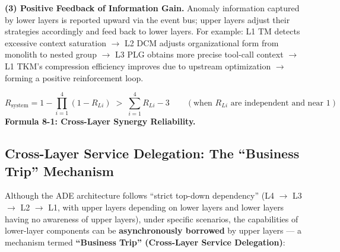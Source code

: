 \documentclass[11pt,a4paper]{article}
\begin{document}
\noindent\textbf{(3) Positive Feedback of Information Gain.} Anomaly information captured by lower layers is reported upward via the event bus; upper layers adjust their strategies accordingly and feed back to lower layers. For example: L1 TM detects excessive context saturation $\rightarrow$ L2 DCM adjusts organizational form from monolith to nested group $\rightarrow$ L3 PLG obtains more precise tool-call context $\rightarrow$ L1 TKM's compression efficiency improves due to upstream optimization $\rightarrow$ forming a positive reinforcement loop.

\begin{equation}\label{eq:cross-layer-synergy}
R_{\text{system}} = 1 - \prod_{i=1}^{4} (1 - R_{Li}) \;>\; \sum_{i=1}^{4} R_{Li} - 3 \qquad (\text{when } R_{Li} \text{ are independent and near } 1)
\end{equation}
\smallskip
\noindent\textbf{Formula 8-1: Cross-Layer Synergy Reliability.}

\subsection{Cross-Layer Service Delegation: The ``Business Trip'' Mechanism}

Although the ADE architecture follows ``strict top-down dependency'' (L4 $\rightarrow$ L3 $\rightarrow$ L2 $\rightarrow$ L1, with upper layers depending on lower layers and lower layers having no awareness of upper layers), under specific scenarios, the capabilities of lower-layer components can be \textbf{asynchronously borrowed} by upper layers --- a mechanism termed \textbf{``Business Trip'' (Cross-Layer Service Delegation)}:

\begin{center}
\end{center}
\end{document}
